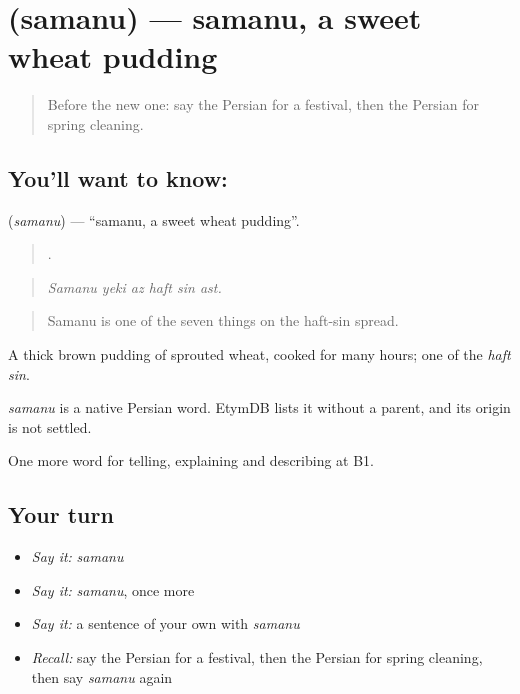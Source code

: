 \section[\texorpdfstring{\fa{سمنو} (samanu)}{سمنو (samanu)}]{ (samanu) — samanu, a sweet wheat pudding}

\label{lesson:FA-C339-samanu}



\begin{quote}
Before the new one: say the Persian for a festival, then the Persian for spring cleaning.
\end{quote}

\subsection*{You'll want to know: }
\textbf{} (\emph{samanu}) — \textquotedblleft{}samanu, a sweet wheat pudding\textquotedblright{}.

\begin{quote}
     .
\end{quote}

\begin{quote}
\emph{Samanu yeki az haft sin ast.}
\end{quote}

\begin{quote}
Samanu is one of the seven things on the haft-sin spread.
\end{quote}

A thick brown pudding of sprouted wheat, cooked for many hours; one of the \emph{haft sin}.

\begin{cousinweb}
\emph{samanu} is a native Persian word. EtymDB lists it without a parent, and its origin is not settled.
\end{cousinweb}

\begin{grammarlens}[title={What you've built}]
One more word for telling, explaining and describing at B1.
\end{grammarlens}

\subsection*{Your turn}
\begin{itemize}
\raggedright
  \item \emph{Say it:} \emph{samanu}
  \item \emph{Say it:} \emph{samanu}, once more
  \item \emph{Say it:} a sentence of your own with \emph{samanu}
  \item \emph{Recall:} say the Persian for a festival, then the Persian for spring cleaning, then say \emph{samanu} again
\end{itemize}

